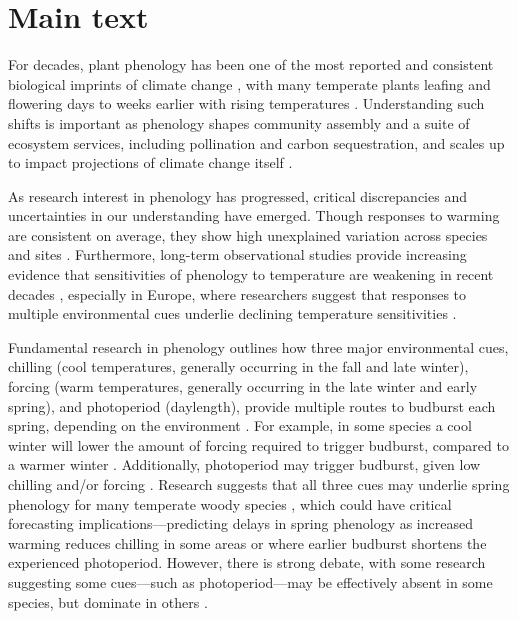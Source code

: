 \documentclass{article}
\begin{document}
\section* {Main text}

\par For decades, plant phenology has been one of the most reported and consistent biological imprints of climate change \citep{IPCC:2014sm}, with many temperate plants leafing and flowering days to weeks earlier with rising temperatures \citep{millerrushing2008,menzel2006}. Understanding such shifts is important as phenology shapes community assembly and a suite of ecosystem services, including pollination and carbon sequestration, and scales up to impact projections of climate change itself \citep{Cleland:2007or}.
\par As research interest in phenology has progressed, critical discrepancies and uncertainties in our understanding have emerged. Though responses to warming are consistent on average, they show high unexplained variation across species and sites \citep{Wolkovich:2012n}. Furthermore, long-term observational studies provide increasing evidence that sensitivities of phenology to temperature are weakening in recent decades \citep{Rutishauser:2008,yu2010}, especially in Europe, where researchers suggest that responses to multiple environmental cues underlie declining temperature sensitivities \citep{fu2015}.


\par Fundamental research in phenology outlines how three major environmental cues, chilling (cool temperatures, generally occurring in the fall and late winter), forcing (warm temperatures, generally occurring in the late winter and early spring), and photoperiod (daylength), provide multiple routes to budburst each spring, depending on the environment \citep{chuineJTB}. For example, in some species a cool winter will lower the amount of forcing required to trigger budburst, compared to a warmer winter \citep{harrington2015}. Additionally, photoperiod may trigger budburst, given low chilling and/or forcing \citep{Basler:2014aa, Caffarra:2011b, zohner2016}. Research suggests that all three cues may underlie spring phenology for many temperate woody species \citep{flynn2018,Basler:2014aa,Caffarra:2011qf}, which could have critical forecasting implications---predicting delays in spring phenology as increased warming reduces chilling in some areas \citep{fraga2019} or where earlier budburst shortens the experienced photoperiod. However, there is strong debate, with some research suggesting some cues---such as photoperiod---may be effectively absent in some species, but dominate in others \citep{zohner2016,koerner2010a}. 
\end{document}
